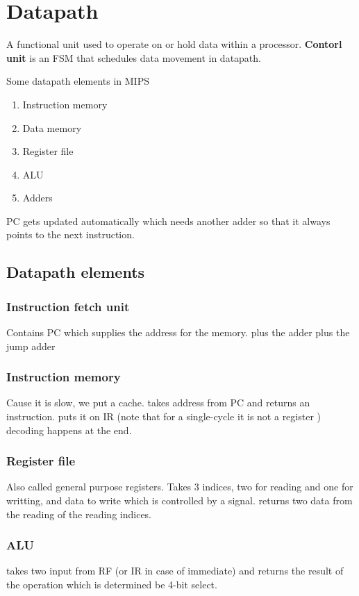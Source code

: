 \chapter{Datapath}
\begin{definition}[Datapath]
    A functional unit used to operate on or hold data within a processor. \textbf{Contorl unit} is an FSM that schedules data movement in datapath.
\end{definition}

\begin{example}
    Some datapath elements in MIPS
    \begin{enumerate}
        \item Instruction memory
        \item Data memory
        \item Register file
        \item ALU
        \item Adders
    \end{enumerate}
\end{example}

PC gets updated automatically which needs another adder so that it always points to the next instruction.
\section{Datapath elements}
\subsection{Instruction fetch unit}
Contains PC which supplies the address for the memory. plus the adder plus the jump adder

\subsection{Instruction memory}
Cause it is slow, we put a cache. takes address from PC and returns an instruction. puts it on IR (note that for a single-cycle it is not a register )
decoding happens at the end.

\subsection{Register file}
Also called general purpose registers. Takes 3 indices, two for reading and one for writting, and data to write which is controlled by a signal. returns two data from the reading of the reading indices.

\subsection{ALU}
takes two input from RF (or IR in case of immediate) and returns the result of the operation which is determined be 4-bit select.

